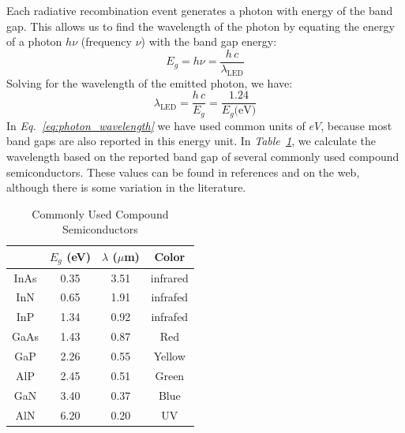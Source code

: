 Each radiative recombination event generates a photon with energy of the band gap.  This allows us to find the wavelength of the photon by equating the energy of a photon $h \nu$ (frequency $\nu$) with the band gap energy:
    \begin{equation} 
        E_g = h \nu = \frac{h\,c}{\lambda_{\text{LED}}} 
    \end{equation}
Solving for the wavelength of the emitted photon, we have:
    \begin{equation} 
        \lambda_{\text{LED}} = \frac{h\,c}{E_g} = \frac{1.24}{E_g \text{(eV)}}
        \label{eq:photon_wavelength}
    \end{equation}
In \emph{Eq.~\ref{eq:photon_wavelength}} we have used common units of $eV$, because most band gaps are also reported in this energy unit.  In \emph{Table~\ref{tab:rainbow}}, we calculate the wavelength based on the reported band gap of several commonly used compound semiconductors.  These values can be found in references and on the web, although there is some variation in the literature.
\begin{table}[H]
    \begin{center}
      \caption{Commonly Used Compound Semiconductors}
        \begin{tabular}{cccc}
            \toprule
            & $E_g$ (eV) & $\lambda$ ($\mu$m) & \textbf{Color} \\
            \midrule
            \rowcolor[rgb]{ .851,  .851,  .851} InAs  & 0.35  & 3.51  & infrared \\
            InN   & 0.65  & 1.91  & infrafed \\
            \rowcolor[rgb]{ .851,  .851,  .851} InP   & 1.34  & 0.92  & infrafed \\
            GaAs  & 1.43  & 0.87  & Red \\
            \rowcolor[rgb]{ .851,  .851,  .851} GaP   & 2.26  & 0.55  & Yellow \\
            AlP   & 2.45  & 0.51  & Green \\
            \rowcolor[rgb]{ .851,  .851,  .851} GaN   & 3.40  & 0.37  & Blue \\
            AlN   & 6.20  & 0.20  & UV \\
            \bottomrule
        \end{tabular}
        \label{tab:rainbow}
    \end{center}
\end{table}
